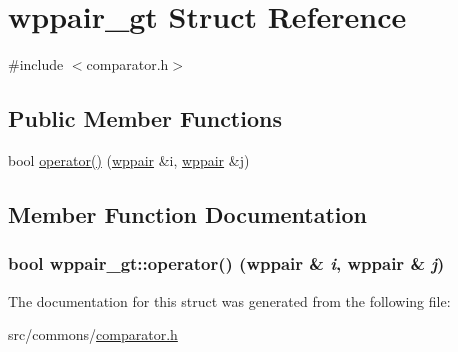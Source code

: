 \hypertarget{structwppair__gt}{
\section{wppair\_\-gt Struct Reference}
\label{structwppair__gt}
}


{\ttfamily \#include $<$comparator.h$>$}

\subsection*{Public Member Functions}
\begin{DoxyCompactItemize}
\item 
bool \hyperlink{structwppair__gt_adbebd4f7a36e4c41709972a9e7b1bb7a}{operator()} (\hyperlink{types_8h_a438cad6e4bc8a21f81e9de264417b9e8}{wppair} \&i, \hyperlink{types_8h_a438cad6e4bc8a21f81e9de264417b9e8}{wppair} \&j)
\end{DoxyCompactItemize}


\subsection{Member Function Documentation}
\hypertarget{structwppair__gt_adbebd4f7a36e4c41709972a9e7b1bb7a}{
\subsubsection[{operator()}]{\setlength{\rightskip}{0pt plus 5cm}bool wppair\_\-gt::operator() ({\bf wppair} \& {\em i}, \/  {\bf wppair} \& {\em j})}}
\label{structwppair__gt_adbebd4f7a36e4c41709972a9e7b1bb7a}


The documentation for this struct was generated from the following file:\begin{DoxyCompactItemize}
\item 
src/commons/\hyperlink{comparator_8h}{comparator.h}\end{DoxyCompactItemize}
